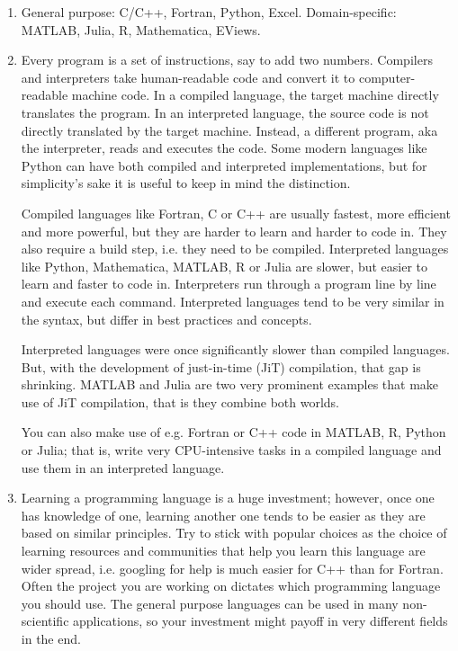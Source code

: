 \begin{enumerate}
\item General purpose: C/C++, Fortran, Python, Excel.
	Domain-specific: MATLAB, Julia, R, Mathematica, EViews.
\item Every program is a set of instructions, say to add two numbers. 
	Compilers and interpreters take human-readable code and convert it to computer-readable machine code.
	In a compiled language, the target machine directly translates the program.
	In an interpreted language, the source code is not directly translated by the target machine.
	Instead, a different program, aka the interpreter, reads and executes the code.
	Some modern languages like Python can have both compiled and interpreted implementations,
	  but for simplicity's sake it is useful to keep in mind the distinction.
		
	Compiled languages like Fortran, C or C++ are usually fastest, more efficient and more powerful,
	  but they are harder to learn and harder to code in.
	They also require a build step, i.e. they need to be compiled.
	Interpreted languages like Python, Mathematica, MATLAB, R or Julia are slower,
	  but easier to learn and faster to code in.
	Interpreters run through a program line by line and execute each command.
	Interpreted languages tend to be very similar in the syntax,
	  but differ in best practices and concepts.
	
	Interpreted languages were once significantly slower than compiled languages.
	But, with the development of just-in-time (JiT) compilation, that gap is shrinking.
	MATLAB and Julia are two very prominent examples that make use of JiT compilation,
	  that is they combine both worlds.

	You can also make use of e.g. Fortran or C++ code in MATLAB, R, Python or Julia;
	  that is, write very CPU-intensive tasks in a compiled language
	  and use them in an interpreted language.
	
\item Learning a programming language is a huge investment;
	however, once one has knowledge of one, learning another one tends to be easier
	  as they are based on similar principles.
	Try to stick with popular choices as the choice of learning resources and communities
	  that help you learn this language are wider spread,
	  i.e. googling for help is much easier for C++ than for Fortran.
	Often the project you are working on dictates which programming language you should use.
	The general purpose languages can be used in many non-scientific applications,
	  so your investment might payoff in very different fields in the end. 
		

\end{enumerate}
